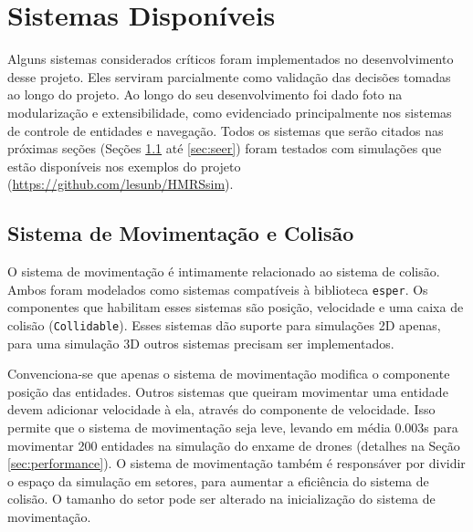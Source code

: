 \begin{adjustwidth}{-1cm}{0cm}
    
\end{adjustwidth}

\section{Sistemas Disponíveis}
\label{sec:systems_available}

Alguns sistemas considerados críticos foram implementados no desenvolvimento desse projeto. Eles serviram parcialmente como validação das decisões tomadas ao longo do projeto. Ao longo do seu desenvolvimento foi dado foto na modularização e extensibilidade, como evidenciado principalmente nos sistemas de controle de entidades e navegação. Todos os sistemas que serão citados nas próximas seções (Seções \ref{sec:movement} até \ref{sec:seer}) foram testados com simulações que estão disponíveis nos exemplos do projeto (\url{https://github.com/lesunb/HMRSsim}).

\subsection{Sistema de Movimentação e Colisão}
\label{sec:movement}

O sistema de movimentação é intimamente relacionado ao sistema de colisão. Ambos foram modelados como sistemas compatíveis à biblioteca \texttt{esper}. Os componentes que habilitam esses sistemas são posição, velocidade e uma caixa de colisão (\texttt{Collidable}). Esses sistemas dão suporte para simulações 2D apenas, para uma simulação 3D outros sistemas precisam ser implementados.

Convenciona-se que apenas o sistema de movimentação modifica o componente posição das entidades. Outros sistemas que queiram movimentar uma entidade devem adicionar velocidade à ela, através do componente de velocidade. Isso permite que o sistema de movimentação seja leve, levando em média 0.003s para movimentar 200 entidades na simulação do enxame de drones (detalhes na Seção \ref{sec:performance}). O sistema de movimentação também é responsáver por dividir o espaço da simulação em setores, para aumentar a eficiência do sistema de colisão. O tamanho do setor pode ser alterado na inicialização do sistema de movimentação.

